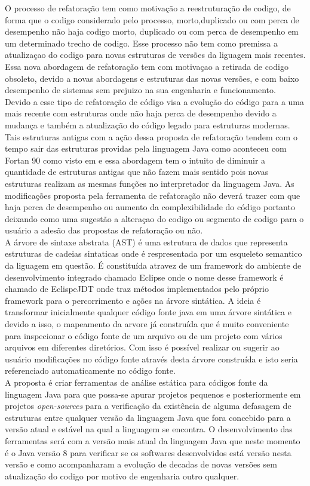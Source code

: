 O processo de refatoração tem como motivação a reestruturação de codigo, de forma que o codigo considerado pelo processo, morto,duplicado ou com perca de desempenho não haja codigo morto, duplicado ou com perca de desempenho em um determinado trecho de codigo. Esse processo não tem como premissa a atualizaçao do codigo para novas estruturas de versões da liguagem mais recentes. Essa nova abordagem de refatoração tem com motivaçao a retirada de codigo obsoleto, devido a novas abordagens e estruturas das novas versões, e com baixo desempenho de sistemas sem prejuizo na sua engenharia e funcionamento.\\

Devido a esse tipo de refatoração de código visa a evolução do código para a uma mais recente com estruturas onde não haja perca de desempenho devido a mudança e também a atualização do código legado para estruturas modernas. Tais estruturas antigas com a ação dessa proposta de refatoração tendem com o tempo sair das estruturas providas pela linguagem Java como aconteceu com Fortan 90 como visto em \cite{Jeffrey_Ralph} e essa abordagem tem o intuito de diminuir a quantidade de estruturas antigas que não fazem mais sentido pois novas estruturas realizam as mesmas funções no interpretador da linguagem Java. As modificações proposta pela ferramenta de refatoração não deverá trazer com que haja perca de desempenho ou aumento da complexibilidade do código portanto deixando como uma sugestão a alteraçao do codigo ou segmento de codigo para o usuário a adesão das propostas de refatoração ou não.\\

A árvore de sintaxe abstrata (AST) é uma estrutura de dados que representa estruturas de cadeias sintaticas onde é respresentada por um esqueleto semantico da liguagem em questão. É constituída atravez de um framework do ambiente de desenvolvimento integrado chamado Eclipse onde o nome desse framework é chamado de EclispeJDT onde traz métodos implementados pelo próprio framework para o percorrimento e ações na árvore sintática. A ideia é transformar inicialmente qualquer código fonte java em uma árvore sintática e devido a isso, o mapeamento da arvore já construída que é muito conveniente para inspecionar o código fonte de um arquivo ou de um projeto com vários arquivos em diferentes diretórios. Com isso é possível realizar ou sugerir ao usuário modificações no código fonte através desta árvore construída e isto seria referenciado automaticamente no código fonte.\\

A proposta é criar ferramentas de análise estática para códigos fonte da linguagem Java para que possa-se apurar projetos pequenos e posteriormente em projetos {\it open-sources} para a verificação da existência de alguma defasagem de estruturas entre qualquer versão da linguagem Java que fora concebido para a versão atual e estável na qual a linguagem se encontra. O desenvolvimento das ferramentas será com a versão mais atual da linguagem Java que neste momento é o Java versão 8 para verificar se os softwares desenvolvidos está versão nesta versão e como acompanharam a evolução de decadas de novas versões sem atualização do codigo por motivo de engenharia outro qualquer.\\